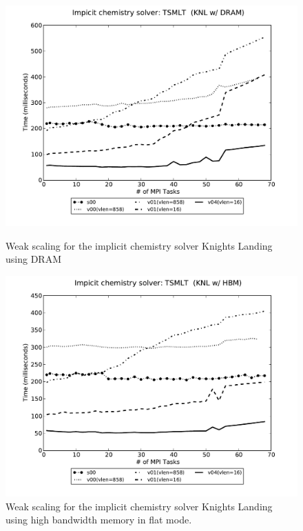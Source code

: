 \begin{figure}[tbp]
\begin{minipage}{1.\textwidth}
     \begin{center}
      \includegraphics[width=12.0cm]{figures/chem-knl-dram.pdf}
      \caption{Weak scaling for the implicit chemistry solver Knights Landing using DRAM}
      \end{center}
\end{minipage}
\begin{minipage}{1.\textwidth}
     \begin{center}
      \includegraphics[width=12.0cm]{figures/chem-knl-hbm.pdf}
      \caption{Weak scaling for the implicit chemistry solver Knights Landing using high bandwidth memory in flat mode.}
      \end{center}
\end{minipage}
\end{figure}

